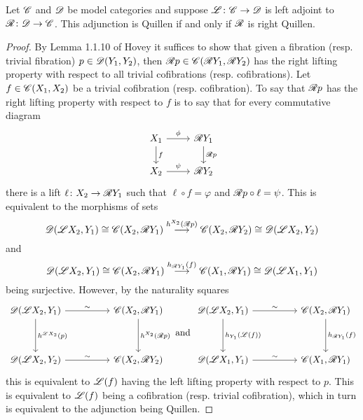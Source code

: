 \documentclass[10pt]{amsart}
\begin{document}

\begin{lem}
  Let $\mathscr{C}$ and $\mathscr{D}$ be model categories and suppose $\mathscr{L} \colon \mathscr{C} \to \mathscr{D}$ is left adjoint to $\mathscr{R} \colon \mathscr{D} \to \mathscr{C}$.
  This adjunction is Quillen if and only if $\mathscr{R}$ is right Quillen.

  \begin{proof}
    By Lemma 1.1.10 of Hovey it suffices to show that given a fibration (resp. trivial fibration) $p \in \mathscr{D}(Y_1, Y_2)$, then $\mathscr{R} p \in \mathscr{C}(\mathscr{R} Y_1, \mathscr{R} Y_2)$ has the right lifting property with respect to all trivial cofibrations (resp. cofibrations).
    Let $f \in \mathscr{C}(X_1, X_2)$ be a trivial cofibration (resp. cofibration).
    To say that $\mathscr{R} p$ has the right lifting property with respect to $f$ is to say that for every commutative diagram
    $$\begin{tikzcd}
      X_1 \arrow{r}{\phi}\arrow{d}{f} & \RA Y_1\arrow{d}{\RA p}\\
      X_2 \arrow{r}{\psi} & \RA Y_2
    \end{tikzcd}$$
    there is a lift $\ell \colon X_2 \to \mathscr{R} Y_1$ such that $\ell \circ f = \varphi$ and $\mathscr{R} p \circ \ell = \psi$.
    This is equivalent to the morphisms of sets
    $$\mathscr{D}(\mathscr{L} X_2, Y_1) \cong \mathscr{C}(X_2, \mathscr{R} Y_1) \overset{h^{X_2}(\mathscr{R} p)}\longrightarrow \mathscr{C}(X_2, \mathscr{R} Y_2) \cong \mathscr{D}(\mathscr{L} X_2, Y_2)$$
    and
    $$\mathscr{D}(\mathscr{L} X_2,Y_1) \cong \mathscr{C}(X_2, \mathscr{R} Y_1) \overset{h_{\mathscr{R} Y_1}(f)}\longrightarrow \mathscr{C}(X_1, \mathscr{R} Y_1) \cong \mathscr{D}(\mathscr{L} X_1, Y_1)$$
    being surjective.
    However, by the naturality squares
    $$\begin{tikzcd}
      \D(\LA X_2, Y_1) \arrow{rr}{\sim} \arrow{dd}{h^{\LA X_2}(p)} && \C(X_2, \RA Y_1)\arrow{dd}{h^{X_2}(\RA p)}\\
      \\
      \D(\LA X_2, Y_2) \arrow{rr}{\sim} && \C(X_2, \RA Y_2)
    \end{tikzcd}
    \ \text{and}\ 
    \begin{tikzcd}
      \D(\LA X_2, Y_1) \arrow{rr}{\sim}\arrow{dd}{h_{Y_1}(\LA(f))} && \C(X_2, \RA Y_1)\arrow{dd}{h_{\RA Y_1}(f)}\\
      \\
      \D(\LA X_1, Y_1) \arrow{rr}{\sim} && \C(X_1, \RA Y_1)
    \end{tikzcd}$$
    this is equivalent to $\mathscr{L}(f)$ having the left lifting property with respect to $p$.
    This is equivalent to $\mathscr{L}(f)$ being a cofibration (resp. trivial cofibration), which in turn is equivalent to the adjunction being Quillen.
  \end{proof}
\end{lem}
\end{document}
